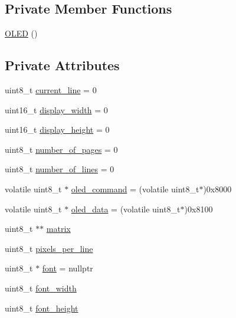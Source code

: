 \subsection*{Private Member Functions}
\begin{DoxyCompactItemize}
\item 
\hyperlink{class_o_l_e_d_a8eabf371b5642d99800adb759dab27fd}{O\-L\-E\-D} ()
\end{DoxyCompactItemize}
\subsection*{Private Attributes}
\begin{DoxyCompactItemize}
\item 
uint8\-\_\-t \hyperlink{class_o_l_e_d_aebd62601be5e2ceef6295721f17fc013}{current\-\_\-line} = 0
\item 
uint16\-\_\-t \hyperlink{class_o_l_e_d_ae88ab3d6d63a7ead982a3b7cc673eefe}{display\-\_\-width} = 0
\item 
uint16\-\_\-t \hyperlink{class_o_l_e_d_aa14ebb59666d7822288115a04ac0a34b}{display\-\_\-height} = 0
\item 
uint8\-\_\-t \hyperlink{class_o_l_e_d_aaac99b0eb4e9dfe92b8571488dc89288}{number\-\_\-of\-\_\-pages} = 0
\item 
uint8\-\_\-t \hyperlink{class_o_l_e_d_a9ea1c55112deede1a61142af276a6bc9}{number\-\_\-of\-\_\-lines} = 0
\item 
volatile uint8\-\_\-t $\ast$ \hyperlink{class_o_l_e_d_af0a85ccd0274347b8c1ac77d298a14cf}{oled\-\_\-command} = (volatile uint8\-\_\-t$\ast$)0x8000
\item 
volatile uint8\-\_\-t $\ast$ \hyperlink{class_o_l_e_d_a1bc54d49808f92ddfc354511b692df6f}{oled\-\_\-data} = (volatile uint8\-\_\-t$\ast$)0x8100
\item 
uint8\-\_\-t $\ast$$\ast$ \hyperlink{class_o_l_e_d_a9d32e21189940afba24deab0a2bc0126}{matrix}
\item 
uint8\-\_\-t \hyperlink{class_o_l_e_d_a6ddac7b826eccac8c682c5246ef52b29}{pixels\-\_\-per\-\_\-line}
\item 
uint8\-\_\-t $\ast$ \hyperlink{class_o_l_e_d_a29ab86a4a73f4d343bf1810927f0911d}{font} = nullptr
\item 
uint8\-\_\-t \hyperlink{class_o_l_e_d_a3c9ea103adf6c860a2534135e9a25ba8}{font\-\_\-width}
\item 
uint8\-\_\-t \hyperlink{class_o_l_e_d_a85b91421932866dea031921799ba83a3}{font\-\_\-height}
\end{DoxyCompactItemize}
